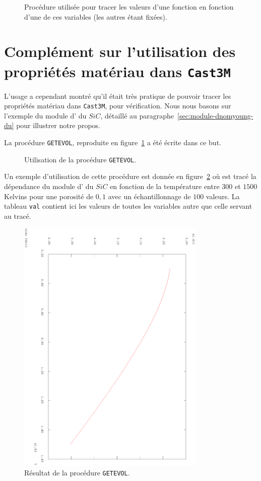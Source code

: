 \documentclass[rectoverso,pleiades,pstricks,leqno,anti]{texmf/note_technique_2010}
\newcommand{\castem}{\texttt{Cast3M}}
\newcommand{\sic}{$SiC$}
\newcommand{\code}[1]{
  \psframebox[linecolor=ceaorange,shadow=true,blur=true]{
    \begin{minipage}[htbp]{1.0\linewidth}
      \ttfamily\scriptsize #1
    \end{minipage}
  }
}
\begin{document}
\begin{figure}[htbp]
  \centering
  \code{
    
  }
  \caption[Code de la procédure \texttt{GETEVOL}]{Procédure utilisée
    pour tracer les valeurs d'une fonction en fonction d'une de ces
    variables (les autres étant fixées).}
  \label{fig:getEvol}
\end{figure}

\clearpage
\newpage
\section{Complément sur l'utilisation des propriétés matériau dans \castem{}}

L'usage a cependant montré qu'il était très pratique de pouvoir tracer
les propriétés matériau dans \castem{}, pour vérification. Nous nous
basons sur l'exemple du module d' du \sic{}, détaillé au
paragraphe~\ref{sec:module-dnomyoung-du} pour illustrer notre propos.

La procédure \texttt{GETEVOL}, reproduite en figure~\ref{fig:getEvol} a
été écrite dans ce but.

\begin{figure}[htbp]
  \centering
  \code{
    
  }
  \caption{Utilisation de la procédure \texttt{GETEVOL}.}
  \label{fig:TestGetEvol}
\end{figure}

Un exemple d'utilisation de cette procédure est donnée en
figure~\ref{fig:TestGetEvol} où est tracé la dépendance du module
d' du \sic{} en fonction de la température entre \(300\) et
\(1500\) Kelvins pour une porosité de \(0,1\) avec un échantillonnage de
\(100\) valeurs. La tableau \texttt{val} contient ici les valeurs de
toutes les variables autre que celle servant au tracé.

\begin{figure}[htbp]
  \centering
  \includegraphics[width=9cm,angle=90]{mfront/GetEvol.eps}
  \caption{Résultat de la procédure \texttt{GETEVOL}.}
  \label{fig:TestGetEvol2}
\end{figure}
\end{document}
